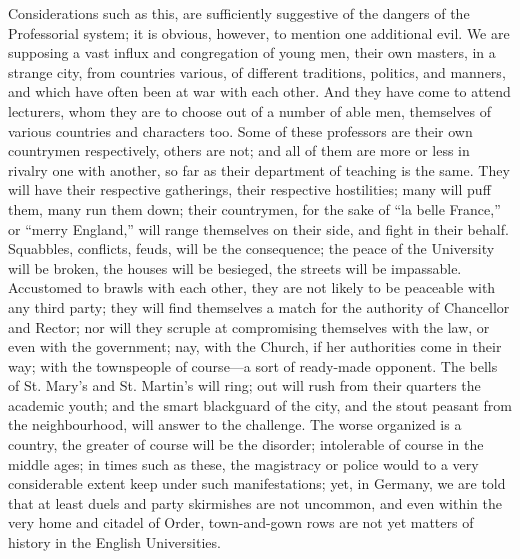 Considerations such as this,
are sufficiently suggestive of the dangers of the Professorial system;
it is obvious, however, to mention one additional evil. We are
supposing a vast influx and congregation of young men, their own
masters, in a strange city, from countries various, of different
traditions, politics, and manners, and which have often been at war
with each other. And they have come to attend lecturers, whom they are
to choose out of a number of able men, themselves of various countries
and characters too. Some of these professors are their own
countrymen respectively, others are not; and all of them are more or
less in rivalry one with another, so far as their department of
teaching is the same. They will have their respective gatherings,
their respective hostilities; many will puff them, many run them down;
their countrymen, for the sake of ``la belle France,'' or ``merry
England,'' will range themselves on their side, and fight in their
behalf. Squabbles, conflicts, feuds, will be the consequence; the
peace of the University will be broken, the houses will be besieged,
the streets will be impassable. Accustomed to brawls with each other,
they are not likely to be peaceable with any third party; they will
find themselves a match for the authority of Chancellor and Rector;
nor will they scruple at compromising themselves with the law, or even
with the government; nay, with the Church, if her authorities come in
their way; with the townspeople of course—a sort of ready-made
opponent. The bells of St. Mary's and St. Martin's will ring; out will
rush from their quarters the academic youth; and the smart blackguard
of the city, and the stout peasant from the neighbourhood, will answer
to the challenge. The worse organized is a country, the greater of
course will be the disorder; intolerable of course in the middle ages;
in times such as these, the magistracy or police would to a very
considerable extent keep under such manifestations; yet, in Germany,
we are told that at least duels and party skirmishes are not uncommon,
and even within the very home and citadel of Order, town-and-gown rows
are not yet matters of history in the English Universities.

